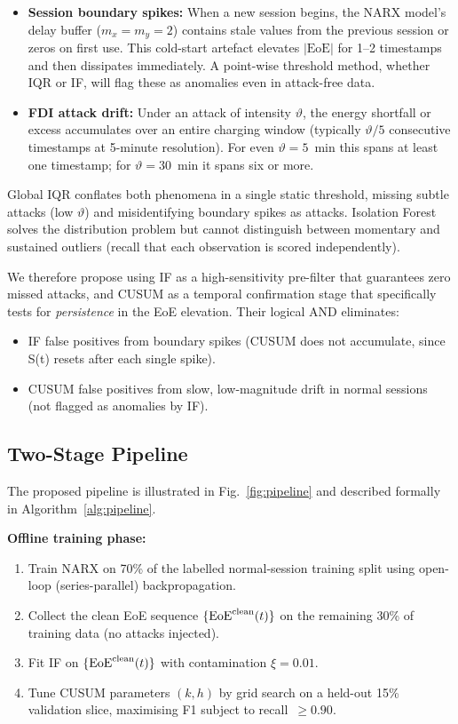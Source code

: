 \documentclass[journal]{IEEEtran}
\newcommand{\eoe}{\mathrm{EoE}}
\begin{document}
\begin{itemize}
\item \textbf{Session boundary spikes:} When a new session begins, the
NARX model's delay buffer ($m_x=m_y=2$) contains stale values from
the previous session or zeros on first use. This cold-start artefact
elevates $|\eoe|$ for 1--2 timestamps and then dissipates
immediately. A point-wise threshold method, whether IQR or IF,
will flag these as anomalies even in attack-free data.

\item \textbf{FDI attack drift:} Under an attack of intensity
$\vartheta$, the energy shortfall or excess accumulates over an entire
charging window (typically $\vartheta/5$ consecutive timestamps at
5-minute resolution). For even $\vartheta=5$~min this spans at least
one timestamp; for $\vartheta=30$~min it spans six or more.

\end{itemize}

Global IQR conflates both phenomena in a single static threshold,
missing subtle attacks (low $\vartheta$) and misidentifying boundary
spikes as attacks. Isolation Forest solves the distribution problem but
cannot distinguish between momentary and sustained outliers (recall that
each observation is scored independently).

We therefore propose using IF as a high-sensitivity pre-filter that
guarantees zero missed attacks, and CUSUM as a temporal confirmation
stage that specifically tests for \emph{persistence} in the EoE
elevation. Their logical AND eliminates:
\begin{itemize}
\item IF false positives from boundary spikes (CUSUM does not accumulate,
since S(t) resets after each single spike).
\item CUSUM false positives from slow, low-magnitude drift in normal
sessions (not flagged as anomalies by IF).
\end{itemize}

\subsection{Two-Stage Pipeline}
\label{ssec:pipeline}

The proposed pipeline is illustrated in Fig.~\ref{fig:pipeline} and
described formally in Algorithm~\ref{alg:pipeline}.

\textbf{Offline training phase:}
\begin{enumerate}
\item Train NARX on 70\% of the labelled normal-session training split
using open-loop (series-parallel) backpropagation.
\item Collect the clean EoE sequence $\{\eoe^{\rm clean}(t)\}$ on
the remaining 30\% of training data (no attacks injected).
\item Fit IF on $\{\eoe^{\rm clean}(t)\}$ with contamination
$\xi=0.01$.
\item Tune CUSUM parameters $(k, h)$ by grid search on a held-out
15\% validation slice, maximising F1 subject to recall~$\geq 0.90$.
\end{enumerate}
\end{document}

